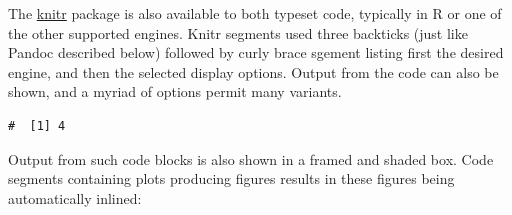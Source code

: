 \documentclass[letterpaper,9pt,twocolumn,twoside,]{pinp}
\begin{document}
The \href{https://cran.r-project.org/package=pinp}{knitr} package
\citep{CRAN:knitr} is also available to both typeset code, typically in
R or one of the other supported engines. Knitr segments used three
backticks (just like Pandoc described below) followed by curly brace
sgement listing first the desired engine, and then the selected display
options. Output from the code can also be shown, and a myriad of options
permit many variants.

\begin{Shaded}
\begin{Highlighting}[]
\StringTok{ } \OperatorTok{+}\StringTok{ }
\end{Highlighting}
\end{Shaded}

\begin{ShadedResult}
\begin{verbatim}
#  [1] 4
\end{verbatim}
\end{ShadedResult}

Output from such code blocks is also shown in a framed and shaded box.
Code segments containing plots producing figures results in these
figures being automatically inlined:

\begin{Shaded}
\begin{Highlighting}[]
\NormalTok{(}\NormalTok{)}
\NormalTok{(}\NormalTok{(}\NormalTok{,}\NormalTok{,}\NormalTok{,}\NormalTok{))}
\NormalTok{(}\NormalTok{(}\NormalTok{(}\NormalTok{)), }\NormalTok{,}
     \NormalTok{)}
\end{Highlighting}
\end{Shaded}
\end{document}
